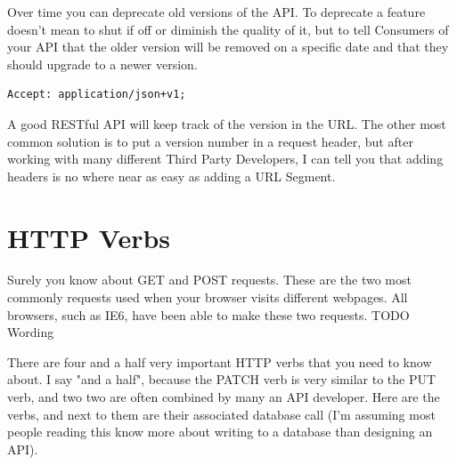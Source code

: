 \documentclass{book}
\begin{document}
Over time you can deprecate old versions of the API. To deprecate a feature doesn't mean to shut if off or diminish the quality of it, but to tell Consumers of your API that the older version will be removed on a specific date and that they should upgrade to a newer version.

\begin{verbatim}
Accept: application/json+v1;
\end{verbatim}

A good RESTful API will keep track of the version in the URL. The other most common solution is to put a version number in a request header, but after working with many different Third Party Developers, I can tell you that adding headers is no where near as easy as adding a URL Segment.


\chapter{HTTP Verbs}

Surely you know about GET and POST requests. These are the two most commonly requests used when your browser visits different webpages. All browsers, such as IE6, have been able to make these two requests. TODO Wording

There are four and a half very important HTTP verbs that you need to know about. I say "and a half", because the PATCH verb is very similar to the PUT verb, and two two are often combined by many an API developer. Here are the verbs, and next to them are their associated database call (I'm assuming most people reading this know more about writing to a database than designing an API).
\end{document}
